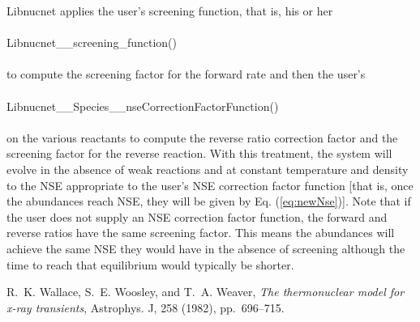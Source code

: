 \documentclass{article}    %
\def\apj{Astrophys. J}
\begin{document}
Libnucnet applies the user's screening function, that is, his or her\\
\\
Libnucnet\_\_screening\_function()\\
\\
to compute the screening
factor for the forward rate and then the user's\\
\\
Libnucnet\_\_Species\_\_nseCorrectionFactorFunction()\\
\\
on the various reactants to compute the reverse ratio correction factor
and the screening factor for the
reverse reaction.  With this treatment, the system will evolve in the
absence of weak reactions and at constant temperature and
density to the NSE appropriate
to the user's NSE correction factor function [that is, once the abundances
reach NSE, they will be given by Eq. (\ref{eq:newNse})].  Note that if the
user does not supply an NSE correction factor function, the forward and
reverse ratios have the same screening factor.
This means the abundances will achieve the same NSE they would have in the
absence of screening although the time to reach that equilibrium would
typically be shorter.


\begin{thebibliography}{1}

{\sc R.~K. {Wallace}, S.~E. {Woosley}, and T.~A. {Weaver}}, {\em The
  thermonuclear model for x-ray transients}, \apj, 258 (1982), pp.~696--715.

\end{thebibliography}
\end{document}
